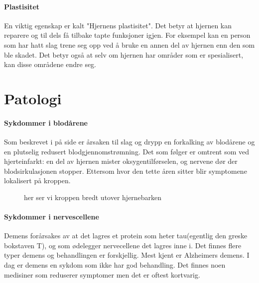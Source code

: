 			\paragraph{Plastisitet\\}
				En viktig egenskap er kalt "Hjernens plastisitet". Det betyr at hjernen kan reparere og til dels få tilbake tapte funksjoner igjen. For eksempel kan en person som har hatt slag trene seg opp ved å bruke en annen del av hjernen enn den som ble skadet. Det betyr også at selv om hjernen har områder som er spesialisert, kan disse områdene endre seg.
		\section{Patologi}
			\paragraph{Sykdommer i blodårene\\}
				Som beskrevet i  på side \pageref{sec:athero} %
				er årsaken til slag og drypp en forkalking av blodårene og en plutselig redusert blodgjennomstrømning\cite{FA-athero}. Det som følger er omtrent som ved hjerteinfarkt: en del av hjernen mister oksygentilførselen, og nervene dør der blodsirkulasjonen stopper. Ettersom hvor den tette åren sitter blir symptomene lokalisert på kroppen.
					\begin{figure}[ht]
                      \centering
                      \caption{her ser vi kroppen bredt utover hjernebarken}
                    \end{figure}
			\paragraph{Sykdommer i nervescellene\\}
				Demens forårsakes av at det lagres et protein som heter tau(egentlig den greske bokstaven T), og som ødelegger nervecellene det lagres inne i. Det finnes flere typer demens og behandlingen er forskjellig. Mest kjent er Alzheimers demens. I dag er demens en sykdom som ikke har god behandling. Det finnes noen medisiner som reduserer symptomer men det er oftest kortvarig. 
